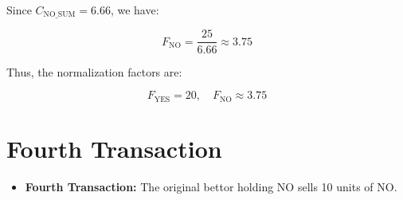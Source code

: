 \documentclass{article}
\begin{document}
Since \( C_{\text{NO\_SUM}} = 6.66 \), we have:

\[
F_{\text{NO}} = \frac{25}{6.66} \approx 3.75
\]

Thus, the normalization factors are:

\[
F_{\text{YES}} = 20, \quad F_{\text{NO}} \approx 3.75
\]

\begin{center}
\end{center}


\newpage


\section{Fourth Transaction}

\begin{itemize}
    \item \textbf{Fourth Transaction:} The original bettor holding NO sells 10 units of NO.
\end{itemize}
\end{document}
